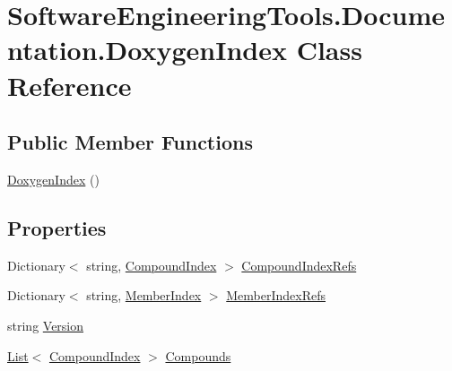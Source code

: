 \hypertarget{class_software_engineering_tools_1_1_documentation_1_1_doxygen_index}{\section{Software\+Engineering\+Tools.\+Documentation.\+Doxygen\+Index Class Reference}
\label{class_software_engineering_tools_1_1_documentation_1_1_doxygen_index}
}
\subsection*{Public Member Functions}
\begin{DoxyCompactItemize}
\item 
\hyperlink{class_software_engineering_tools_1_1_documentation_1_1_doxygen_index_afe55b8cfea9c3832ed08b9bff3bbc270}{Doxygen\+Index} ()
\end{DoxyCompactItemize}
\subsection*{Properties}
\begin{DoxyCompactItemize}
\item 
Dictionary$<$ string, \hyperlink{class_software_engineering_tools_1_1_documentation_1_1_compound_index}{Compound\+Index} $>$ \hyperlink{class_software_engineering_tools_1_1_documentation_1_1_doxygen_index_a88b89adaec87d27c1f8bcc591fad568b}{Compound\+Index\+Refs}
\item 
Dictionary$<$ string, \hyperlink{class_software_engineering_tools_1_1_documentation_1_1_member_index}{Member\+Index} $>$ \hyperlink{class_software_engineering_tools_1_1_documentation_1_1_doxygen_index_a622b810e809f28139b79b1f68219d4a3}{Member\+Index\+Refs}
\item 
string \hyperlink{class_software_engineering_tools_1_1_documentation_1_1_doxygen_index_a2404d2a8a639f5a475a044a1ce37f6df}{Version}
\item 
\hyperlink{namespace_software_engineering_tools_1_1_documentation_ae0bccf4f49a76db084c1c316e5954ec9a4ee29ca12c7d126654bd0e5275de6135}{List}$<$ \hyperlink{class_software_engineering_tools_1_1_documentation_1_1_compound_index}{Compound\+Index} $>$ \hyperlink{class_software_engineering_tools_1_1_documentation_1_1_doxygen_index_a947083d15b69cc2e070f905c0e10c129}{Compounds}
\end{DoxyCompactItemize}


